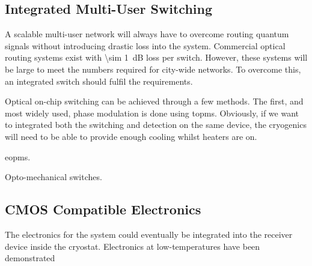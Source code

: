 \subsection{Integrated Multi-User Switching}

A scalable multi-user network will always have to overcome routing quantum signals without introducing drastic loss into the system. Commercial optical routing systems exist with \SI{\sim 1}{dB} loss per switch. However, these systems will be large to meet the numbers required for city-wide networks. To overcome this, an integrated switch should fulfil the requirements. 

Optical on-chip switching can be achieved through a few methods. The first, and most widely used, phase modulation is done using \acp{topm}. Obviously, if we want to integrated both the switching and detection on the same device, the cryogenics will need to be able to provide enough cooling whilst heaters are on.

\acp{eopm}.

Opto-mechanical switches.

\subsection{CMOS Compatible Electronics}

The electronics for the system could eventually be integrated into the receiver device inside the cryostat. Electronics at low-temperatures have been demonstrated \cite{bardin2019}

